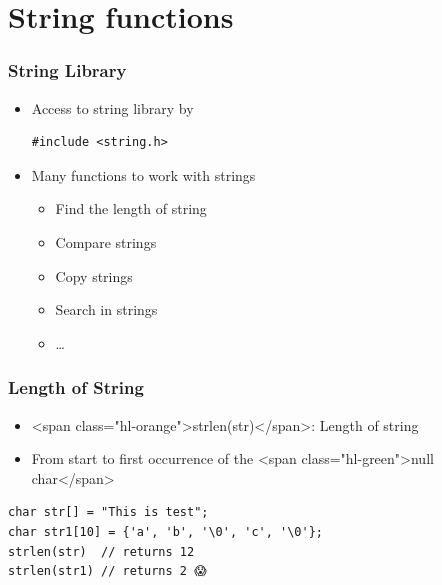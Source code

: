 \documentclass{../c-lecture}
\begin{document}
\section{String functions}

\begin{frame}[fragile]
  \frametitle{String Library}
  \begin{itemize}
    \item Access to string library by
    \begin{verbatim}
#include <string.h>
    \end{verbatim}
    \item Many functions to work with strings
    \begin{itemize}
      \item Find the length of string
      \item Compare strings
      \item Copy strings
      \item Search in strings
      \item \ldots
    \end{itemize}
  \end{itemize}
\end{frame}

\begin{frame}[fragile]
  \frametitle{Length of String}
  \begin{itemize}
    \item <span class="hl-orange">strlen(str)</span>: Length of string
    \item
      From start to first occurrence of the
      <span class="hl-green">null char</span>

  \end{itemize}
  \begin{verbatim}
char str[] = "This is test";
char str1[10] = {'a', 'b', '\0', 'c', '\0'};
strlen(str)  // returns 12
strlen(str1) // returns 2 😱
  \end{verbatim}
\end{frame}
\end{document}
